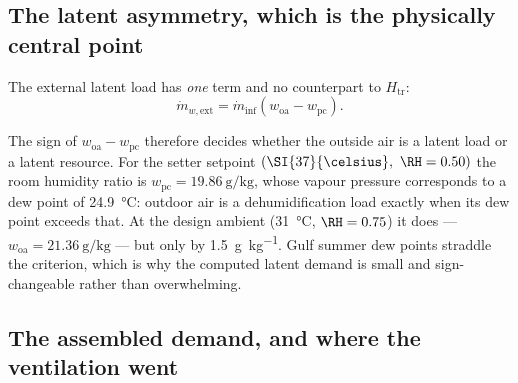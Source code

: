 \subsection{The latent asymmetry, which is the physically central point}
\label{sec:dem:asymmetry}

The external latent load has \emph{one} term and no counterpart to
$H_{\mathrm{tr}}$:
\begin{equation}
\dot m_{w,\mathrm{ext}}=\dot m_{\mathrm{inf}}\left(w_{\mathrm{oa}}-w_{\mathrm{pc}}\right).
\label{eq:dem:mwext}
\end{equation}

\begin{center}
\end{center}

The sign of $w_{\mathrm{oa}}-w_{\mathrm{pc}}$ therefore decides whether the
outside air is a latent load or a latent resource. For the setter setpoint
$(\SI{37}{\celsius},\ \RH=0.50)$ the room humidity ratio is
$w_{\mathrm{pc}}=\SI{19.86}{\gram\per\kilogram}$, whose vapour pressure
corresponds to a dew point of \SI{24.9}{\celsius}: outdoor air is a
dehumidification load exactly when its dew point exceeds that. At the design
ambient (\SI{31}{\celsius}, $\RH=0.75$) it does ---
$w_{\mathrm{oa}}=\SI{21.36}{\gram\per\kilogram}$ --- but only by
\SI{1.5}{\gram\per\kilogram}. Gulf summer dew points straddle the criterion,
which is why the computed latent demand is small and sign-changeable rather than
overwhelming.

\subsection{The assembled demand, and where the ventilation went}
\label{sec:dem:assembled}

